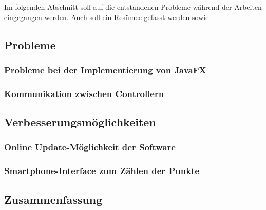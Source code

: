 Im folgenden Abschnitt soll auf die entstandenen Probleme während der Arbeiten eingegangen werden.
Auch soll ein Resümee gefasst werden sowie
\subsection{Probleme}
\subsubsection{Probleme bei der Implementierung von JavaFX}
\subsubsection{Kommunikation zwischen Controllern}
\subsection{Verbesserungsmöglichkeiten}
\subsubsection{Online Update-Möglichkeit der Software}
\subsubsection{Smartphone-Interface zum Zählen der Punkte}
\subsection{Zusammenfassung}